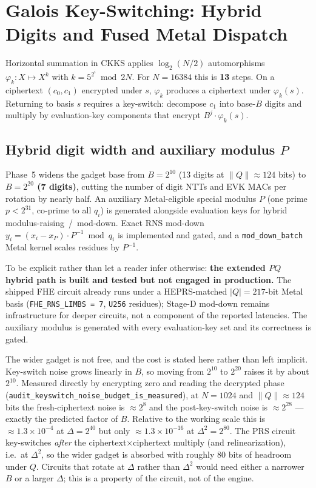 \documentclass[11pt,a4paper]{article}
\DeclareRobustCommand{\code}[1]{\texttt{#1}}
\begin{document}
\section{Galois Key-Switching: Hybrid Digits and Fused Metal Dispatch}
\label{sec:ks}

Horizontal summation in CKKS applies $\log_2(N/2)$ automorphisms
$\varphi_k\colon X \mapsto X^k$ with $k = 5^{2^i} \bmod 2N$. For $N = 16384$ this
is \textbf{13} steps. On a ciphertext $(c_0, c_1)$ encrypted under $s$,
$\varphi_k$ produces a ciphertext under $\varphi_k(s)$. Returning to basis $s$
requires a key-switch: decompose $c_1$ into base-$B$ digits and multiply by
evaluation-key components that encrypt $B^j \cdot \varphi_k(s)$.

\subsection{Hybrid digit width and auxiliary modulus \texorpdfstring{$P$}{P}}
\label{sec:hybrid}

Phase~5 widens the gadget base from $B = 2^{10}$ (13 digits at
$\|Q\|\approx 124$ bits) to \textbf{$B = 2^{20}$ (7 digits)}, cutting the number
of digit NTTs and EVK MACs per rotation by nearly half. An auxiliary
Metal-eligible special modulus $P$ (one prime $p < 2^{31}$, co-prime to all
$q_i$) is generated alongside evaluation keys for hybrid modulus-raising~/~mod-down.
Exact RNS mod-down $y_i = (x_i - x_P)\cdot P^{-1} \bmod q_i$ is implemented and
gated, and a \code{mod\_down\_batch} Metal kernel scales residues by $P^{-1}$.

To be explicit rather than let a reader infer otherwise: \textbf{the extended $PQ$
hybrid path is built and tested but not engaged in production.} The shipped FHE
circuit already runs under a HEPRS-matched $|Q| = 217$-bit Metal basis
(\code{FHE\_RNS\_LIMBS = 7}, \code{U256} residues); Stage-D mod-down remains
infrastructure for deeper circuits, not a component of the reported latencies. The
auxiliary modulus is generated with every evaluation-key set and its correctness is
gated.

The wider gadget is not free, and the cost is stated here rather than left
implicit. Key-switch noise grows linearly in $B$, so moving from $2^{10}$ to
$2^{20}$ raises it by about $2^{10}$. Measured directly by encrypting zero and
reading the decrypted phase
(\code{audit\_keyswitch\_noise\_budget\_is\_measured}), at $N = 1024$ and
$\|Q\| \approx 124$ bits the fresh-ciphertext noise is $\approx 2^{8}$ and the
post-key-switch noise is $\approx 2^{28}$ --- exactly the predicted factor of $B$.
Relative to the working scale this is $\approx 1.3\times 10^{-4}$ at
$\Delta = 2^{40}$ but only $\approx 1.3\times 10^{-16}$ at $\Delta^{2} = 2^{80}$.
The PRS circuit key-switches \textit{after} the ciphertext$\times$ciphertext
multiply (and relinearization), i.e.\ at $\Delta^{2}$, so the wider gadget is
absorbed with roughly 80 bits of headroom under $Q$. Circuits that rotate at
$\Delta$ rather than $\Delta^{2}$ would need either a narrower $B$ or a larger
$\Delta$; this is a property of the circuit, not of the engine.
\end{document}
